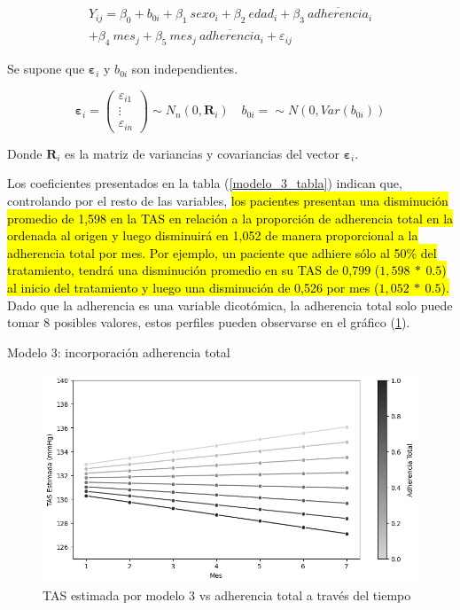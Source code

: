 \documentclass[spanish]{article}
\numberwithin{figure}{subsection}
\numberwithin{equation}{subsection}
\numberwithin{table}{subsection}
\begin{document}
\begin{multline}
	\label{modelo_3}
	Y_{ij} = \beta_0 + b_{0i} + \beta_1\ sexo_i + \beta_2\ edad_i + \beta_3\ \overline{adherencia}_i \\
	+ \beta_4\ mes_j + \beta_5\ mes_j\ \overline{adherencia}_i + \varepsilon_{ij}
\end{multline}

Se supone que $\bm{\varepsilon}_i$ y $b_{0i}$ son independientes.

\[ 
	\bm{\varepsilon}_i = \begin{pmatrix} \varepsilon_{i1} \\ \vdots \\ \varepsilon_{in} \end{pmatrix} \sim N_{n}(0, \bm{R}_i)
	\quad
	b_{0i} = \sim N(0, Var(b_{0i}))
\]

Donde $\bm{R}_i$ es la matriz de variancias y covariancias del vector
$\bm{\varepsilon}_i$.

Los coeficientes presentados en la tabla (\ref{modelo_3_tabla}) indican que,
controlando por el resto de las variables, \hl{los pacientes presentan una
disminución promedio de 1,598 en la TAS en relación a la proporción de
adherencia total en la ordenada al origen y luego disminuirá en 1,052 de manera
proporcional a la adherencia total por mes. Por ejemplo, un paciente que adhiere
sólo al 50\% del tratamiento, tendrá una disminución promedio en su TAS de 0,799
($1,598\ *\ 0.5$) al inicio del tratamiento y luego una disminución de 0,526 por
mes ($1,052\ *\ 0.5$).} Dado que la adherencia es una variable dicotómica, la
adherencia total solo puede tomar 8 posibles valores, estos perfiles pueden
observarse en el gráfico (\ref{modelo_3_plot}).

\begin{table}[H]
	\centering
	\caption{Modelo 3: incorporación adherencia total}
	\label{modelo_3_tabla}
	
\end{table}

\begin{figure}[H]
	\centering
	\includegraphics[scale=0.5]{img/modelo_3.png}
	\caption{TAS estimada por modelo 3 vs adherencia total a través del tiempo}
	\label{modelo_3_plot}
\end{figure}
\end{document}
